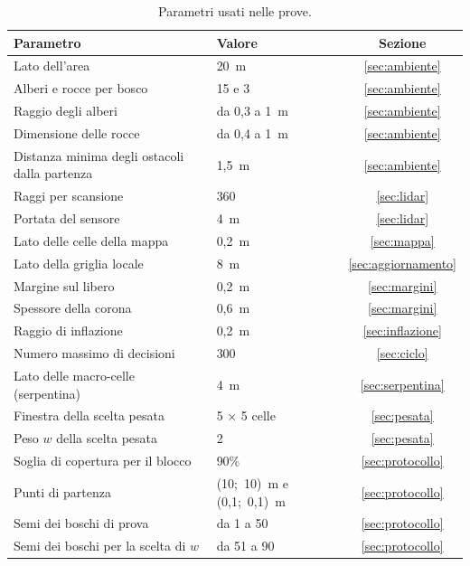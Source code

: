 \begin{table}[!htb]
    \centering
    \small
    \begin{tabular}{@{}llc@{}}
        \toprule
        Parametro & Valore & Sezione \\
        \midrule
        Lato dell'area & 20~m & \ref{sec:ambiente} \\
        Alberi e rocce per bosco & 15 e 3 & \ref{sec:ambiente} \\
        Raggio degli alberi & da 0,3 a 1~m & \ref{sec:ambiente} \\
        Dimensione delle rocce & da 0,4 a 1~m & \ref{sec:ambiente} \\
        Distanza minima degli ostacoli dalla partenza & 1,5~m & \ref{sec:ambiente} \\
        Raggi per scansione & 360 & \ref{sec:lidar} \\
        Portata del sensore & 4~m & \ref{sec:lidar} \\
        Lato delle celle della mappa & 0,2~m & \ref{sec:mappa} \\
        Lato della griglia locale & 8~m & \ref{sec:aggiornamento} \\
        Margine sul libero & 0,2~m & \ref{sec:margini} \\
        Spessore della corona & 0,6~m & \ref{sec:margini} \\
        Raggio di inflazione & 0,2~m & \ref{sec:inflazione} \\
        Numero massimo di decisioni & 300 & \ref{sec:ciclo} \\
        Lato delle macro-celle (serpentina) & 4~m & \ref{sec:serpentina} \\
        Finestra della scelta pesata & 5 $\times$ 5 celle & \ref{sec:pesata} \\
        Peso $w$ della scelta pesata & 2 & \ref{sec:pesata} \\
        Soglia di copertura per il blocco & 90\% & \ref{sec:protocollo} \\
        Punti di partenza & (10;~10)~m e (0,1;~0,1)~m & \ref{sec:protocollo} \\
        Semi dei boschi di prova & da 1 a 50 & \ref{sec:protocollo} \\
        Semi dei boschi per la scelta di $w$ & da 51 a 90 & \ref{sec:protocollo} \\
        \bottomrule
    \end{tabular}
    \caption{Parametri usati nelle prove.}
    \label{tab:parametri}
\end{table}
